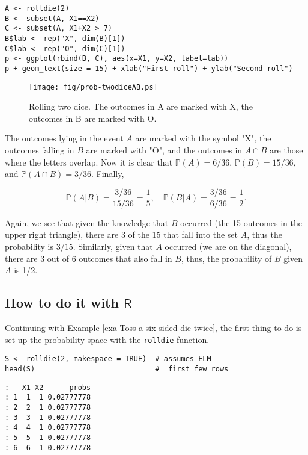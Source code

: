 \begin{verbatim}
A <- rolldie(2)
B <- subset(A, X1==X2)
C <- subset(A, X1+X2 > 7)
B$lab <- rep("X", dim(B)[1])
C$lab <- rep("O", dim(C)[1])
p <- ggplot(rbind(B, C), aes(x=X1, y=X2, label=lab))
p + geom_text(size = 15) + xlab("First roll") + ylab("Second roll")
\end{verbatim}

\begin{figure}[ht!]
\centering
\texttt{[image: fig/prob-twodiceAB.ps]}
\caption[Rolling two dice]{\label{fig-twodiceAB}\small Rolling two dice. The outcomes in A are marked with X, the outcomes in B are marked with O.}
\end{figure}

The outcomes lying in the event \(A\) are marked with the symbol
"X", the outcomes falling in \(B\) are marked with "O", and the
outcomes in \(A\cap B\) are those where the letters overlap. Now it is
clear that \(\mathbb{P}(A)=6/36\), \(\mathbb{P}(B)=15/36\), and
\(\mathbb{P}(A\cap B)=3/36\).  Finally, 

\[
\mathbb{P}(A|B)=\frac{3/36}{15/36}=\frac{1}{5},\quad
\mathbb{P}(B|A)=\frac{3/36}{6/36}=\frac{1}{2}.  
\] 

Again, we see that given the knowledge that \(B\) occurred (the 15
outcomes in the upper right triangle), there are 3 of the 15 that fall
into the set \(A\), thus the probability is \(3/15\). Similarly, given
that \(A\) occurred (we are on the diagonal), there are 3 out of 6
outcomes that also fall in \(B\), thus, the probability of \(B\) given
\(A\) is 1/2.

\subsection{How to do it with \(\mathsf{R}\)}
\label{sec-4-6-1}

Continuing with Example \ref{exa-Toss-a-six-sided-die-twice}, the first thing to do is set
up the probability space with the \texttt{rolldie} function.

\begin{verbatim}
S <- rolldie(2, makespace = TRUE)  # assumes ELM
head(S)                            #  first few rows
\end{verbatim}

\begin{verbatim}
:   X1 X2      probs
: 1  1  1 0.02777778
: 2  2  1 0.02777778
: 3  3  1 0.02777778
: 4  4  1 0.02777778
: 5  5  1 0.02777778
: 6  6  1 0.02777778
\end{verbatim}


